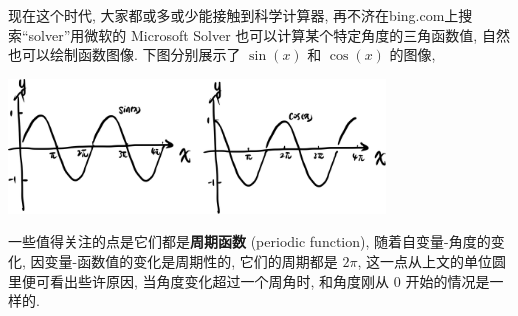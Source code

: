 \begin{tcolorbox}[size=fbox, breakable, enhanced jigsaw, title={三角函数的图像}]

现在这个时代, 大家都或多或少能接触到科学计算器,
再不济在bing.com上搜索``solver''用微软的 Microsoft Solver
也可以计算某个特定角度的三角函数值, 自然也可以绘制函数图像.
下图分别展示了 $\sin(x)$ 和 $\cos(x)$ 的图像,

\begin{tcolorbox}[size=fbox, breakable, enhanced jigsaw]
\includegraphics[width=0.75\textwidth]{img/image-20230316171137500.png}
\end{tcolorbox}

一些值得关注的点是它们都是\textbf{周期函数} (periodic function),
随着自变量-角度的变化, 因变量-函数值的变化是周期性的, 它们的周期都是
$2\pi$, 这一点从上文的单位圆里便可看出些许原因,
当角度变化超过一个周角时, 和角度刚从 $0$ 开始的情况是一样的.

\end{tcolorbox}